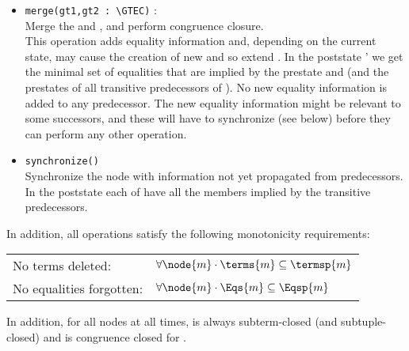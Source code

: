 \begin{itemize}
	\item \lstinline{merge(gt1,gt2 : \GTEC)} : \GTEC \\
	Merge the \GTEC {} and , and perform congruence closure.\\
	This operation adds equality information and, depending on the current state, may cause the creation of new \GTECs and so extend .
	In the poststate ' we get the minimal set of equalities that are implied by the prestate  and  (and the prestates of all transitive predecessors of ). No new equality information is added to any predecessor.
	The new equality information might be relevant to some successors, and these will have to synchronize (see below) before they can perform any other operation.

	\item \lstinline{synchronize()} \\
		Synchronize the node  with information not yet propagated from predecessors.\\
		In the poststate each of  have all the members implied by the transitive predecessors.
\end{itemize}

In addition, all operations satisfy the following monotonicity requirements:\\
\begin{tabular}{ll}
No terms deleted:        & $\forall \node{m} \cdot \terms{m} \subseteq \termsp{m}$ \\
No equalities forgotten: & $\forall \node{m} \cdot \Eqs{m}   \subseteq \Eqsp{m}$ \\
\end{tabular}

In addition, for all nodes at all times,  is always subterm-closed (and subtuple-closed)
 and  is congruence closed for .

